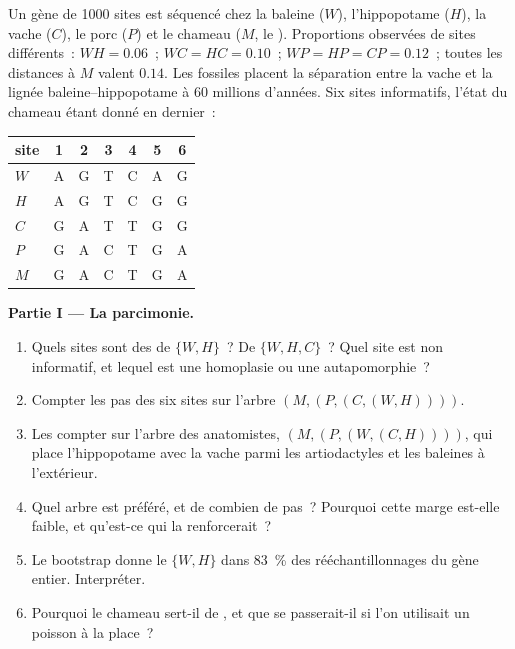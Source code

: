 \begin{problem}
\label{pb:b2:phylogenetic-trees:1}
Un gène de \num{1000} sites est séquencé chez la baleine ($W$),
l'hippopotame
($H$), la vache ($C$), le porc ($P$) et le chameau ($M$, le ). Proportions observées de sites différents~: $WH = 0.06$~; $WC = HC = 0.10$~; $WP =
HP = CP = 0.12$~; toutes les distances à $M$ valent $0.14$. Les fossiles
placent la séparation entre la vache et la lignée baleine--hippopotame à
60 millions d'années.
Six sites informatifs, l'état du chameau étant donné en dernier~:
\begin{center}
\begin{tabular}{l@{\quad}cccccc}
site & 1 & 2 & 3 & 4 & 5 & 6 \\ \hline
$W$ & A & G & T & C & A & G \\
$H$ & A & G & T & C & G & G \\
$C$ & G & A & T & T & G & G \\
$P$ & G & A & C & T & G & A \\
$M$ & G & A & C & T & G & A \\
\end{tabular}
\end{center}

\medskip
\noindent\textbf{Partie I --- La parcimonie.}
\begin{enumerate}
  \item Quels sites sont des  de $\{W, H\}$~? De $\{W, H,
        C\}$~? Quel site est non informatif, et lequel est une homoplasie
        ou une autapomorphie~?
  \item Compter les pas des six sites sur l'arbre
        $(M,(P,(C,(W,H))))$.
  \item Les compter sur l'arbre des anatomistes, $(M,(P,(W,(C,H))))$,
        qui place l'hippopotame avec la vache parmi les artiodactyles et
        les baleines à l'extérieur.
  \item Quel arbre est préféré, et de combien de pas~? Pourquoi cette
        marge est-elle faible, et qu'est-ce qui la renforcerait~?
  \item Le bootstrap donne le  $\{W, H\}$ dans \qty{83}{\%} des
        rééchantillonnages du gène entier. Interpréter.
  \item Pourquoi le chameau sert-il de , et que se
        passerait-il si l'on utilisait un poisson à la place~?
\end{enumerate}


\end{problem}

